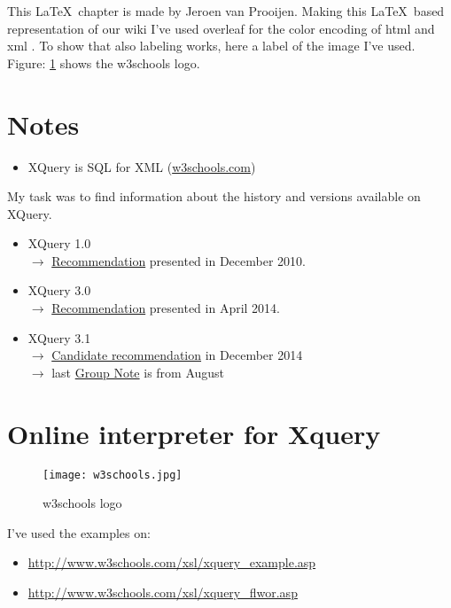 This \LaTeX\ chapter is made by Jeroen van Prooijen. Making this \LaTeX\ based representation of our wiki I've used overleaf for the color encoding of html and xml \cite{overleaf}.
To show that also labeling works, here a label of the image I've used. Figure: \ref{fig:w3schools_logo} shows the w3schools logo.

\section{Notes}
\begin{itemize}
\item XQuery is SQL for XML (\url{w3schools.com})
\end{itemize}

My task was to find information about the history and versions available on XQuery.

\begin{itemize}
\item XQuery 1.0 \hfill \\
$\rightarrow$ \href{http://www.w3.org/TR/xquery/}{Recommendation} presented in December 2010.
\item XQuery 3.0 \hfill \\
$\rightarrow$ \href{http://www.w3.org/TR/xquery-30/}{Recommendation} presented in April 2014.
\item XQuery 3.1 \hfill \\
$\rightarrow$ \href{http://www.w3.org/TR/xquery-3/}{Candidate recommendation} in December 2014 \\ 
$\rightarrow$ last \href{http://www.w3.org/TR/xquery-31-requirements/}{Group Note} is from August
\end{itemize}

\section{Online interpreter for Xquery}

\begin{figure}[h]
\centering
\texttt{[image: w3schools.jpg]}
\caption{w3schools logo\cite{w3schools}}
\label{fig:w3schools_logo}
\end{figure}

I've used the examples on:
\begin{itemize}
\item \url{http://www.w3schools.com/xsl/xquery_example.asp}
\item \url{http://www.w3schools.com/xsl/xquery_flwor.asp}
\end{itemize}



